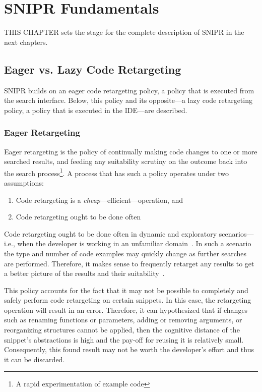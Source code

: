 \chapter{\uppercase{SnipR} Fundamentals}{}
\label{sec:fundamentals}


\lettrine[lraise=0.1, nindent=0em, slope=-.5em]{T} {HIS CHAPTER} sets the stage for the complete description of \uppercase{SnipR} in the next chapters.

\section{Eager vs. Lazy Code Retargeting}
\label{sec:eagervslazy}

\uppercase{SnipR} builds on an eager code retargeting policy, a policy that is executed from the search interface. Below, this policy and its opposite---a lazy code retargeting policy, a policy that is executed in the IDE---are described.

\subsection{Eager Retargeting}

Eager retargeting is the policy of continually making code changes to one or more searched results, and feeding any suitability scrutiny on the outcome back into the search process\footnote{A rapid experimentation of example code}. A process that has such a policy operates under two assumptions:

\begin{enumerate}
	\item Code retargeting is a \emph{cheap}---efficient---operation, and
	\item Code retargeting ought to be done often
\end{enumerate}

Code retargeting ought to be done often in dynamic and exploratory scenarios---i.e., when the developer is working in an unfamiliar domain~\cite{Brandt:2009ew}. In such a scenario the type and number of code examples may quickly change as further searches are performed. Therefore, it makes sense to frequently retarget any results to get a better picture of the results and their suitability~\cite{Fowler:1999vp, Brandt:2009ew}. 

This policy accounts for the fact that it may not be possible to completely and safely perform code retargeting on certain snippets. In this case, the retargeting operation will result in an error. Therefore, it can hypothesized that if changes such as renaming functions or parameters, adding or removing arguments, or reorganizing structures cannot be applied, then the cognitive distance of the snippet's abstractions is high and the pay-off for reusing it is relatively small. Consequently, this found result may not be worth the developer's effort and thus it can be discarded.    

